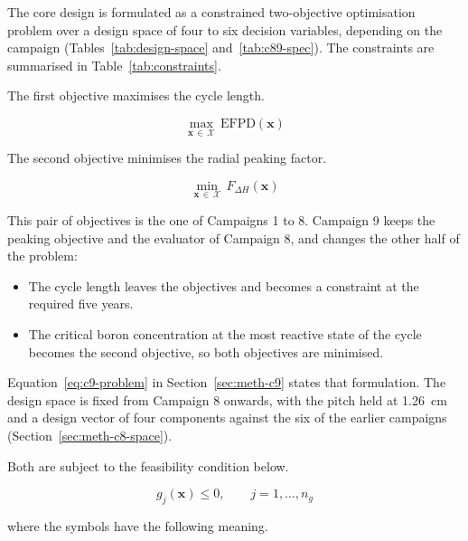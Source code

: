 The core design is formulated as a constrained two-objective
optimisation problem over a design space of four to six decision
variables, depending on the campaign (Tables~\ref{tab:design-space}
and~\ref{tab:c89-spec}). The constraints are summarised in
Table~\ref{tab:constraints}.

The first objective maximises the cycle length.

\begin{equation}
\max_{\mathbf{x}\,\in\,\mathcal{X}} \, \mathrm{EFPD}(\mathbf{x})
\label{eq:obj_efpd}
\end{equation}

The second objective minimises the radial peaking factor.

\begin{equation}
\min_{\mathbf{x}\,\in\,\mathcal{X}} \, F_{\Delta H}(\mathbf{x})
\label{eq:obj_fdh}
\end{equation}

This pair of objectives is the one of Campaigns 1 to 8. Campaign 9 keeps
the peaking objective and the evaluator of Campaign 8, and changes the
other half of the problem:

\begin{itemize}
  \item The cycle length leaves the objectives and becomes a constraint
        at the required five years.

  \item The critical boron concentration at the most reactive state of
        the cycle becomes the second objective, so both objectives are
        minimised.
\end{itemize}

Equation~\eqref{eq:c9-problem} in Section~\ref{sec:meth-c9} states that
formulation. The design space is fixed from Campaign 8 onwards, with the
pitch held at \SI{1.26}{cm} and a design vector of four components
against the six of the earlier campaigns
(Section~\ref{sec:meth-c8-space}).

Both are subject to the feasibility condition below.

\begin{equation}
g_j(\mathbf{x}) \le 0,
\qquad j = 1,\dots,n_g
\label{eq:constraint_form}
\end{equation}

\noindent where the symbols have the following meaning.

